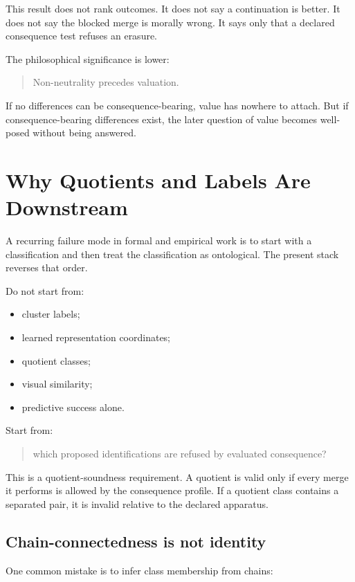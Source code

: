 \documentclass[11pt]{article}
\begin{document}
This result does not rank outcomes. It does not say a continuation is better.
It does not say the blocked merge is morally wrong. It says only that a
declared consequence test refuses an erasure.

The philosophical significance is lower:

\begin{quote}
Non-neutrality precedes valuation.
\end{quote}

If no differences can be consequence-bearing, value has nowhere to attach. But
if consequence-bearing differences exist, the later question of value becomes
well-posed without being answered.

\section{Why Quotients and Labels Are Downstream}

A recurring failure mode in formal and empirical work is to start with a
classification and then treat the classification as ontological. The present
stack reverses that order.

Do not start from:

\begin{itemize}[leftmargin=*]
  \item cluster labels;
  \item learned representation coordinates;
  \item quotient classes;
  \item visual similarity;
  \item predictive success alone.
\end{itemize}

Start from:

\begin{quote}
which proposed identifications are refused by evaluated consequence?
\end{quote}

This is a quotient-soundness requirement. A quotient is valid only if every
merge it performs is allowed by the consequence profile. If a quotient class
contains a separated pair, it is invalid relative to the declared apparatus.

\subsection{Chain-connectedness is not identity}

One common mistake is to infer class membership from chains:
\end{document}
